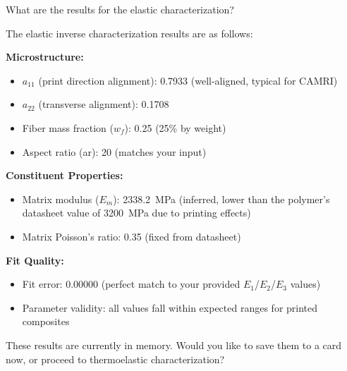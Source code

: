 \documentclass[preprint,review,10pt,number]{elsarticle}
\begin{document}
\begin{center}
\begin{tcolorbox}
\vspace{8pt}
\begin{tcolorbox}[
    breakable,
    colback=gray!8, colframe=gray!60, boxrule=0.5pt, arc=2pt,
    left=6pt, right=6pt, top=4pt, bottom=4pt,
    title={\textbf{User}}, fonttitle=\small\bfseries, coltitle=black
]
\small
What are the results for the elastic characterization?
\end{tcolorbox}
\vspace{4pt}
\begin{tcolorbox}[
    breakable,
    colback=gray!3, colframe=gray!40, boxrule=0.5pt, arc=2pt,
    left=6pt, right=6pt, top=4pt, bottom=4pt,
    title={\textbf{\texttt{MateriAl}}}, fonttitle=\small\bfseries, coltitle=black
]
\small
The elastic inverse characterization results are as follows:
\vspace{4pt}

\textbf{Microstructure:}
\begin{itemize}[leftmargin=1.2em, itemsep=0pt, topsep=2pt]
\item $a_{11}$ (print direction alignment): 0.7933 (well-aligned, typical for CAMRI)
\item $a_{22}$ (transverse alignment): 0.1708
\item Fiber mass fraction ($w_f$): 0.25 (25\% by weight)
\item Aspect ratio (ar): 20 (matches your input)
\end{itemize}

\textbf{Constituent Properties:}
\begin{itemize}[leftmargin=1.2em, itemsep=0pt, topsep=2pt]
\item Matrix modulus ($E_m$): 2338.2~MPa (inferred, lower than the polymer's datasheet value of 3200~MPa due to printing effects)
\item Matrix Poisson's ratio: 0.35 (fixed from datasheet)
\end{itemize}

\textbf{Fit Quality:}
\begin{itemize}[leftmargin=1.2em, itemsep=0pt, topsep=2pt]
\item Fit error: 0.00000 (perfect match to your provided $E_1$/$E_2$/$E_3$ values)
\item Parameter validity: all values fall within expected ranges for printed composites
\end{itemize}
\vspace{4pt}
These results are currently in memory. Would you like to save them to a card now, or proceed to thermoelastic characterization?
\end{tcolorbox}


\end{tcolorbox}
\end{center}
\end{document}
